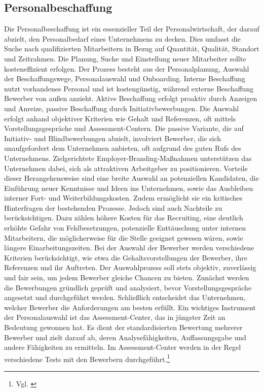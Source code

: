 \subsection{Personalbeschaffung}
\label{sec:personalbeschaffung} %
Die Personalbeschaffung ist ein essenzieller Teil der Personalwirtschaft, der darauf abzielt, den Personalbedarf eines Unternehmens zu decken. Dies umfasst die Suche nach qualifizierten Mitarbeitern in Bezug auf Quantität, Qualität, Standort und Zeitrahmen. Die Planung, Suche und Einstellung neuer Mitarbeiter sollte kosteneffizient erfolgen. Der Prozess besteht aus der Personalplanung, Auswahl der Beschaffungswege, Personalauswahl und Onboarding. Interne Beschaffung nutzt vorhandenes Personal und ist kostengünstig, während externe Beschaffung Bewerber von außen anzieht. Aktive Beschaffung erfolgt proaktiv durch Anzeigen und Anreize, passive Beschaffung durch Initiativbewerbungen. Die Auswahl erfolgt anhand objektiver Kriterien wie Gehalt und Referenzen, oft mittels Vorstellungsgespräche und Assessment-Centern. Die passive Variante, die auf Initiativ- und Blindbewerbungen abzielt, involviert Bewerber, die sich unaufgefordert dem Unternehmen anbieten, oft aufgrund des guten Rufs des Unternehmens. Zielgerichtete Employer-Branding-Maßnahmen unterstützen das Unternehmen dabei, sich als attraktiven Arbeitgeber zu positionieren. Vorteile dieser Herangehensweise sind eine breite Auswahl an potenziellen Kandidaten, die Einführung neuer Kenntnisse und Ideen ins Unternehmen, sowie das Ausbleiben interner Fort- und Weiterbildungskosten. Zudem ermöglicht sie ein kritisches Hinterfragen der bestehenden Prozesse. Jedoch sind auch Nachteile zu berücksichtigen. Dazu zählen höhere Kosten für das Recruiting, eine deutlich erhöhte Gefahr von Fehlbesetzungen, potenzielle Enttäuschung unter internen Mitarbeitern, die möglicherweise für die Stelle geeignet gewesen wären, sowie längere Einarbeitungszeiten. Bei der Auswahl der Bewerber werden verschiedene Kriterien berücksichtigt, wie etwa die Gehaltsvorstellungen der Bewerber, ihre Referenzen und ihr Auftreten. Der Auswahlprozess soll stets objektiv, zuverlässig und fair sein, um jedem Bewerber gleiche Chancen zu bieten. Zunächst werden die Bewerbungen gründlich geprüft und analysiert, bevor Vorstellungsgespräche angesetzt und durchgeführt werden. Schließlich entscheidet das Unternehmen, welcher Bewerber die Anforderungen am besten erfüllt. Ein wichtiges Instrument der Personalauswahl ist das Assessment-Center, das in jüngster Zeit an Bedeutung gewonnen hat. Es dient der standardisierten Bewertung mehrerer Bewerber und zielt darauf ab, deren Analysefähigkeiten, Auffassungsgabe und andere Fähigkeiten zu ermitteln. Im Assessment-Center werden in der Regel verschiedene Tests mit den Bewerbern durchgeführt.\footnote{Vgl. \cite{Studyflix2024}} 


